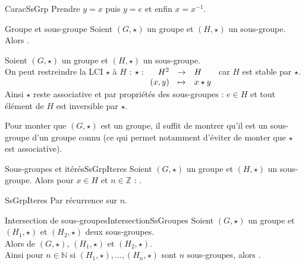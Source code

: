\documentclass[12pt,a4paper]{report}
\begin{document}
    \begin{principedemo}{CaracSsGrp}
    Prendre $y = x$ puis $y = e$ et enfin $x = x^{-1}$.
    \end{principedemo}
    
    \begin{theoreme}{Groupe et sous-groupe}{}
    Soient $(G, \star)$ un groupe et $(H, \star)$ un sous-groupe. Alors .
    \end{theoreme}
    
    \begin{demo}
    Soient $(G, \star)$ un groupe et $(H, \star)$ un sous-groupe.\\
    On peut restreindre la LCI $\star$ à $H$ : $\star : \begin{array}[t]{rcl} H^2 & \rightarrow & H \\ (x, y) & \mapsto & x \star y \end{array}$ car $H$ est stable par $\star$.\\
    Ainsi $\star$ reste associative et par propriétés des sous-groupes : $e \in H$ et tout élément de $H$ est inversible par $\star$.
    \end{demo}
    
    \begin{remarque}
    Pour monter que $(G, \star)$ est un groupe, il suffit de montrer qu'il est un sous-groupe d'un groupe connu (ce qui permet notamment d'éviter de monter que $\star$ est associative).
    \end{remarque}
    
    \begin{proposition}{Sous-groupes et itérés}{SsGrpIteres}
     Soient $(G, \star)$ un groupe et $(H, \star)$ un sous-groupe. Alors pour $x \in H$ et $n \in \mathbb{Z}$ : .
    \end{proposition}
    
    \begin{principedemo}{SsGrpIteres}
    Par récurrence sur $n$.
    \end{principedemo}
    
    \begin{proposition}{Intersection de sous-groupes}{IntersectionSsGroupes}
    Soient $(G, \star)$ un groupe et $(H_1, \star)$ et $(H_2, \star)$ deux sous-groupes.\\
     Alors  de $(G, \star)$, $(H_1, \star)$ et $(H_2, \star)$.\\
     Ainsi pour $n \in \mathbb{N}$ si $(H_1, \star), ..., (H_n, \star)$ sont $n$ sous-groupes, alors .
    \end{proposition}
    
\end{document}
